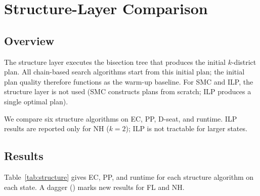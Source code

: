 \section{Structure-Layer Comparison}
\label{sec:structure}

\subsection{Overview}

The structure layer executes the bisection tree that produces the initial
$k$-district plan.
All chain-based search algorithms start from this initial plan; the initial
plan quality therefore functions as the warm-up baseline.
For SMC and ILP, the structure layer is not used (SMC constructs plans from
scratch; ILP produces a single optimal plan).

We compare six structure algorithms on EC, PP, D-seat, and runtime.
ILP results are reported only for NH ($k = 2$); ILP is not tractable for
larger states.

\subsection{Results}

Table~\ref{tab:structure} gives EC, PP, and runtime for each structure
algorithm on each state.
A dagger (\dag{}) marks new results for FL and NH.

